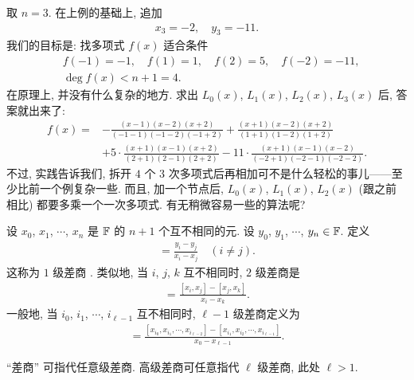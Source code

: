 \begin{example}
    取 $n = 3$. 在上例的基础上, 追加
    \begin{align*}
        x_3 = -2, \quad y_3 = -11.
    \end{align*}
    我们的目标是: 找多项式 $f(x)$ 适合条件
    \begin{align*}
         & f(-1) = -1, \quad f(1) = 1, \quad f(2) = 5, \quad f(-2) = -11, \\
         & \deg f(x) < n + 1 = 4.
    \end{align*}
    在原理上, 并没有什么复杂的地方. 求出 $L_0 (x)$, $L_1 (x)$, $L_2 (x)$, $L_3 (x)$ 后, 答案就出来了:
    \begin{align*}
        f(x)
        = {} & - \frac{(x-1)(x-2)(x+2)}{(-1-1)(-1-2)(-1+2)} + \frac{(x+1)(x-2)(x+2)}{(1+1)(1-2)(1+2)}                   \\
             & + 5 \cdot \frac{(x+1)(x-1)(x+2)}{(2+1)(2-1)(2+2)} - 11 \cdot \frac{(x+1)(x-1)(x-2)}{(-2+1)(-2-1)(-2-2)}.
    \end{align*}
    不过, 实践告诉我们, 拆开 $4$ 个 $3$ 次多项式后再相加可不是什么轻松的事儿——至少比前一个例复杂一些. 而且, 加一个节点后, $L_0 (x)$, $L_1 (x)$, $L_2 (x)$ (跟之前相比) 都要多乘一个一次多项式. 有无稍微容易一些的算法呢?
\end{example}

\begin{definition}
    设 $x_0$, $x_1$, $\cdots$, $x_{n}$ 是 $\mathbb{F}$ 的 $n+1$ 个互不相同的元. 设 $y_0$, $y_1$, $\cdots$, $y_{n} \in \mathbb{F}$. 定义
    \begin{align*}
        [x_i, x_j] = \frac{y_i - y_j}{x_i - x_j} \quad (i \neq j).
    \end{align*}
    这称为 $1$ 级差商 . 类似地, 当 $i$, $j$, $k$ 互不相同时, $2$ 级差商是
    \begin{align*}
        [x_i, x_j, x_k] = \frac{[x_i, x_j] - [x_j, x_k]}{x_i - x_k}.
    \end{align*}
    一般地, 当 $i_0$, $i_1$, $\cdots$, $i_{\ell - 1}$ 互不相同时, $\ell - 1$ 级差商定义为
    \begin{align*}
        [x_{i_0}, x_{i_1}, \cdots, x_{i_{\ell - 1}}] = \frac{[x_{i_0}, x_{i_1}, \cdots, x_{i_{\ell - 2}}] - [x_{i_1}, x_{i_2}, \cdots, x_{i_{\ell - 1}}]}{x_0 - x_{\ell - 1}}.
    \end{align*}

    ``差商'' 可指代任意级差商. 高级差商可任意指代 $\ell$ 级差商, 此处 $\ell > 1$.
\end{definition}

